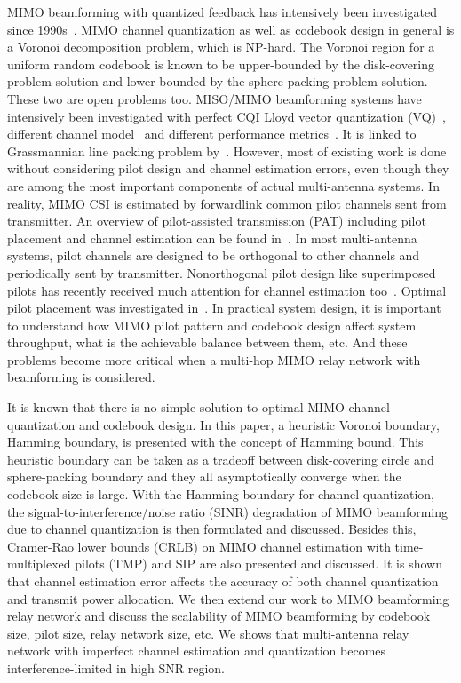\documentclass[10pt,fleqn, twocolumn]{IEEEtran}
\begin{document}
MIMO beamforming with quantized feedback has intensively been
investigated since 1990s~\cite{Gerlach94}. MIMO channel
quantization as well as codebook design in general is a Voronoi
decomposition problem, which is NP-hard. The Voronoi region for a
uniform random codebook is known to be upper-bounded by the
disk-covering problem solution and lower-bounded by the
sphere-packing problem solution. These two are open problems too.
MISO/MIMO beamforming systems have intensively been investigated
with perfect CQI Lloyd vector quantization (VQ)~\cite{Narula98},
different channel model~\cite{Mukka03} and different performance
metrics~\cite{PXia04,Roh04}. It is linked to Grassmannian line
packing problem by~\cite{Love02}. However, most of existing work
is done without considering pilot design and channel estimation
errors, even though they are among the most important components
of actual multi-antenna systems. In reality, MIMO CSI is estimated
by forwardlink common pilot channels sent from transmitter. An
overview of pilot-assisted transmission (PAT) including pilot
placement and channel estimation can be found in~\cite{Tong04}. In
most multi-antenna systems, pilot channels are designed to be
orthogonal to other channels and periodically sent by transmitter.
Nonorthogonal pilot design like superimposed pilots has recently
received much attention for channel estimation
too~\cite{Coldrey06}. Optimal pilot placement was investigated
in~\cite{Dong02}. In practical system design, it is important to
understand how MIMO pilot pattern and codebook design affect
system throughput, what is the achievable balance between them,
etc. And these problems become more critical when a multi-hop MIMO
relay network with beamforming is considered.

It is known that there is no simple solution to optimal MIMO
channel quantization and codebook design. In this paper, a
heuristic Voronoi boundary, Hamming boundary, is presented with
the concept of Hamming bound. This heuristic boundary can be taken
as a tradeoff between disk-covering circle and sphere-packing
boundary and they all asymptotically converge when the codebook
size is large. With the Hamming boundary for channel quantization,
the signal-to-interference/noise ratio (SINR) degradation of MIMO
beamforming due to channel quantization is then formulated and
discussed. Besides this, Cramer-Rao lower bounds (CRLB) on MIMO
channel estimation with time-multiplexed pilots (TMP) and SIP are
also presented and discussed. It is shown that channel estimation
error affects the accuracy of both channel quantization and
transmit power allocation. We then extend our work to MIMO
beamforming relay network and discuss the scalability of MIMO
beamforming by codebook size, pilot size, relay network size, etc.
We shows that multi-antenna relay network with imperfect channel
estimation and quantization becomes interference-limited in high
SNR region.
\end{document}
